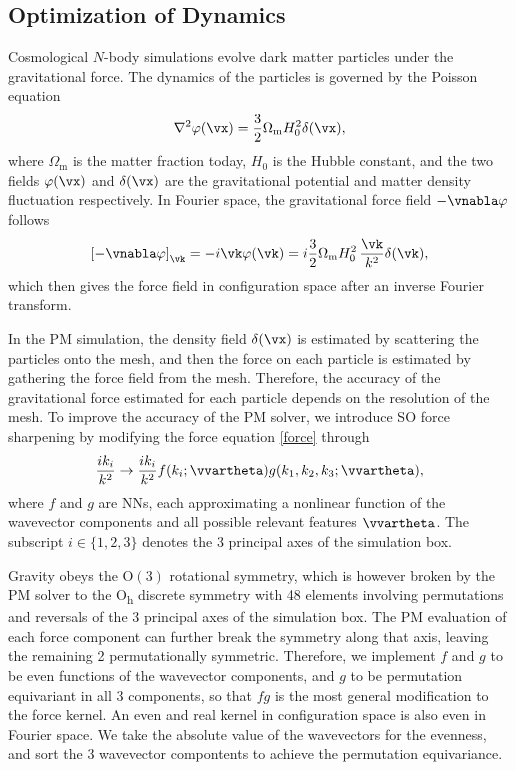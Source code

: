 \documentclass[modern, trackchanges, dvipsnames]{aastex631}
\newcommand{\Omegam}{\Omega_\mathrm{m}}
\begin{document}
\subsection{Optimization of Dynamics}

Cosmological $N$-body simulations evolve dark matter particles under the
gravitational force.
The dynamics of the particles is governed by the Poisson equation
%
\begin{equation}
  \nabla^2 \varphi(\vx) = \frac32 \Omegam H_0^2 \delta(\vx),
\end{equation}
%
where $\Omegam$ is the matter fraction today, $H_0$ is the Hubble
constant, and the two fields $\varphi(\vx)$ and $\delta(\vx)$ are the
gravitational potential and matter density fluctuation respectively.
In Fourier space, the gravitational force field $- \vnabla \varphi$
follows
%
\begin{equation}
\left[- \vnabla \varphi\right]_\vk = - i \vk \varphi(\vk) =
                  i \frac32 \Omegam H_0^2 \,\frac{\vk}{k^2} \delta(\vk),
\label{force}
\end{equation}
%
which then gives the force field in configuration space after an inverse
Fourier transform.

In the PM simulation, the density field $\delta(\vx)$ is estimated by
scattering the particles onto the mesh, and then the force on each
particle is estimated by gathering the force field from the mesh.
Therefore, the accuracy of the gravitational force estimated for each
particle depends on the resolution of the mesh.
To improve the accuracy of the PM solver, we introduce SO force
sharpening by modifying the force equation \eqref{force} through
%
\begin{equation}
\frac{i k_i}{k^2} \to \frac{i k_i}{k^2}
  f(k_i; \vvartheta) g(k_1, k_2, k_3; \vvartheta),
\end{equation}
%
where $f$ and $g$ are NNs, each approximating a nonlinear function of
the wavevector components and all possible relevant features
$\vvartheta$.
The subscript $i\in\{1,2,3\}$ denotes the 3 principal axes of the
simulation box.

Gravity obeys the $\mathrm{O}(3)$ rotational symmetry, which is however
broken by the PM solver to the O\textsubscript{h} discrete symmetry with
48 elements involving permutations and reversals of the 3 principal axes
of the simulation box.
The PM evaluation of each force component can further break the symmetry
along that axis, leaving the remaining 2 permutationally symmetric.
Therefore, we implement $f$ and $g$ to be even functions of the
wavevector components, and $g$ to be permutation equivariant in all 3
components, so that $f g$ is the most general modification to the force
kernel.
An even and real kernel in configuration space is also even in Fourier
space.
We take the absolute value of the wavevectors for the evenness, and sort
the 3 wavevector compontents to achieve the permutation equivariance.
\end{document}
